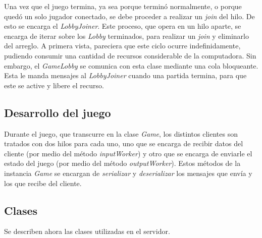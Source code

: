 \indent Una vez que el juego termina, ya sea porque terminó normalmente, o porque quedó un solo jugador conectado, se debe proceder a realizar un \textit{\emph{join}} del hilo. De esto se encarga el \textit{\emph{LobbyJoiner}}. Este proceso, que opera en un hilo aparte, se encarga de iterar sobre los \textit{Lobby} terminados, para realizar un \textit{join} y eliminarlo del arreglo. A primera vista, pareciera que este ciclo ocurre indefinidamente, pudiendo consumir una cantidad de recursos considerable de la computadora. Sin embargo, el \textit{GameLobby} se comunica con esta clase mediante una cola bloqueante. Esta le manda mensajes al \textit{LobbyJoiner} cuando una partida termina, para que este se active y libere el recurso.

\subsection{Desarrollo del juego}
Durante el juego, que transcurre en la clase \textit{Game}, los distintos clientes son tratados con dos hilos para cada uno, uno que se encarga de recibir datos del cliente (por medio del método \textit{\emph{inputWorker}}) y otro que se encarga de enviarle el estado del juego (por medio del método \textit{\emph{outputWorker}}). Estos métodos de la instancia \textit{Game} se encargan de \emph{serializar} y \emph{deserializar} los mensajes que envía y los que recibe del cliente.

\subsection{Clases}

Se describen ahora las clases utilizadas en el servidor.

